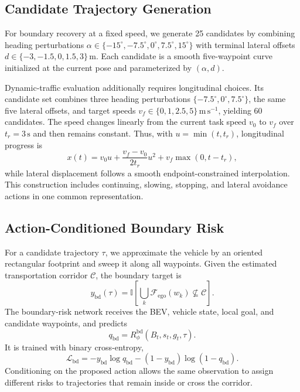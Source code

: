 \subsection{Candidate Trajectory Generation}
\label{sec:candidate_generation}

For boundary recovery at a fixed speed, we generate 25 candidates by combining heading perturbations
$\alpha\in\{-15^\circ,-7.5^\circ,0^\circ,7.5^\circ,15^\circ\}$ with terminal lateral offsets
$d\in\{-3,-1.5,0,1.5,3\}\,\mathrm{m}$. Each candidate is a smooth five-waypoint curve initialized at the current pose and parameterized by $(\alpha,d)$.

Dynamic-traffic evaluation additionally requires longitudinal choices. Its candidate set combines three heading perturbations $\{-7.5^\circ,0^\circ,7.5^\circ\}$, the same five lateral offsets, and target speeds $v_f\in\{0,1,2.5,5\}\,\mathrm{m\,s^{-1}}$, yielding 60 candidates. The speed changes linearly from the current task speed $v_0$ to $v_f$ over $t_r=3\,\mathrm{s}$ and then remains constant. Thus, with $u=\min(t,t_r)$, longitudinal progress is
\begin{equation}
x(t)=v_0u+\frac{v_f-v_0}{2t_r}u^2+v_f\max(0,t-t_r),
\end{equation}
while lateral displacement follows a smooth endpoint-constrained interpolation. This construction includes continuing, slowing, stopping, and lateral avoidance actions in one common representation.

\subsection{Action-Conditioned Boundary Risk}

For a candidate trajectory $\tau$, we approximate the vehicle by an oriented rectangular footprint and sweep it along all waypoints. Given the estimated transportation corridor $\mathcal{C}$, the boundary target is
\begin{equation}
y_{\mathrm{bd}}(\tau)=
\mathbb{I}\!\left[\bigcup_k \mathcal{F}_{\mathrm{ego}}(w_k)
\not\subseteq \mathcal{C}\right].
\label{eq:boundary_target}
\end{equation}
The boundary-risk network receives the BEV, vehicle state, local goal, and candidate waypoints, and predicts
\begin{equation}
q_{\mathrm{bd}}=R_{\phi}^{\mathrm{bd}}(B_t,s_t,g_t,\tau).
\label{eq:risk}
\end{equation}
It is trained with binary cross-entropy,
\begin{equation}
\mathcal{L}_{\mathrm{bd}}=
-y_{\mathrm{bd}}\log q_{\mathrm{bd}}
-(1-y_{\mathrm{bd}})\log(1-q_{\mathrm{bd}}).
\label{eq:risk_loss}
\end{equation}
Conditioning on the proposed action allows the same observation to assign different risks to trajectories that remain inside or cross the corridor.

